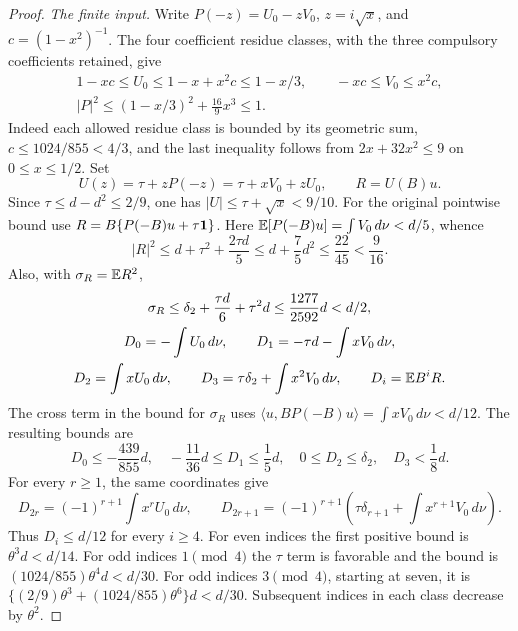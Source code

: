 \begin{proof}
\emph{The finite input.}
Write \(P(-z)=U_0-zV_0\), \(z=i\sqrt x\), and \(c=(1-x^2)^{-1}\).
The four coefficient residue classes, with the three compulsory
coefficients retained, give
\begin{equation}\label{eq:R28:global-mask-coordinates}
 \begin{gathered}
 1-xc\le U_0\le1-x+x^2c\le1-x/3,\qquad
 -xc\le V_0\le x^2c,\\
 |P|^2\le(1-x/3)^2+\frac{16}{9}x^3\le1.
 \end{gathered}
\end{equation}
Indeed each allowed residue class is bounded by its geometric sum,
\(c\le1024/855<4/3\), and the last inequality follows from
\(2x+32x^2\le9\) on \(0\le x\le1/2\).
Set
\[
 U(z)=\tau+zP(-z)=\tau+xV_0+zU_0,\qquad R=U(B)u.
\]
Since \(\tau\le d-d^2\le2/9\), one has
\(|U|\le\tau+\sqrt x<9/10\).
For the original pointwise bound use
\(R=B\{P(-B)u+\tau\mathbf1\}\).
Here \(\mathbb E[P(-B)u]=\int V_0\,d\nu<d/5\), whence
\[
 |R|^2\le d+\tau^2+\frac{2\tau d}{5}
 \le d+\frac75d^2\le\frac{22}{45}<\frac9{16}.
\]
Also, with \(\sigma_R=\mathbb E R^2\),
\begin{equation}\label{eq:R28:global-mask-signed-data}
 \begin{gathered}
 \sigma_R\le\delta_2+\frac{\tau d}{6}+\tau^2d
 \le\frac{1277}{2592}d<d/2,\\
 D_0=-\int U_0\,d\nu,\qquad
 D_1=-\tau d-\int xV_0\,d\nu,\\
 D_2=\int xU_0\,d\nu,\qquad
 D_3=\tau\delta_2+\int x^2V_0\,d\nu,
 \qquad D_i=\mathbb E B^iR.
 \end{gathered}
\end{equation}
The cross term in the bound for \(\sigma_R\) uses
\(\langle u,BP(-B)u\rangle=\int xV_0\,d\nu<d/12\).
The resulting bounds are
\[
 D_0\le-\frac{439}{855}d,\quad
 -\frac{11}{36}d\le D_1\le\frac15d,\quad
 0\le D_2\le\delta_2,\quad D_3<\frac18d.
\]
For every \(r\ge1\), the same coordinates give
\[
 D_{2r}=(-1)^{r+1}\int x^rU_0\,d\nu,\qquad
 D_{2r+1}=(-1)^{r+1}
 \left(\tau\delta_{r+1}+\int x^{r+1}V_0\,d\nu\right).
\]
Thus \(D_i\le d/12\) for every \(i\ge4\).
For even indices the first positive bound is
\(\theta^3d<d/14\). For odd indices \(1\pmod4\) the
\(\tau\) term is favorable and the bound is
\((1024/855)\theta^4d<d/30\). For odd indices \(3\pmod4\),
starting at seven, it is
\(\{(2/9)\theta^3+(1024/855)\theta^6\}d<d/30\).
Subsequent indices in each class decrease by \(\theta^2\).


\end{proof}
